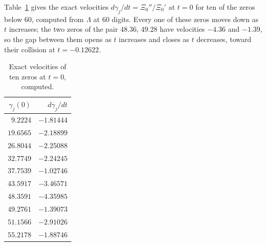 Table~\ref{tab:ch16:vel} gives the exact velocities $d\gamma_j/dt=\Xi_0''/\Xi_0'$ at $t=0$ for ten of the zeros below $60$, computed from $\Lambda$ at $60$ digits. Every one of these zeros moves down as $t$ increases; the two zeros of the pair $48.36$, $49.28$ have velocities $-4.36$ and $-1.39$, so the gap between them opens as $t$ increases and closes as $t$ decreases, toward their collision at $t=-0.12622$.

\begin{table}[htbp]
\centering\small
\begin{tabular}{rr}
\toprule
$\gamma_j(0)$ & $d\gamma_j/dt$\\
\midrule
$9.2224$ & $-1.81444$\\
$19.6565$ & $-2.18899$\\
$26.8044$ & $-2.25088$\\
$32.7749$ & $-2.24245$\\
$37.7539$ & $-1.02746$\\
$43.5917$ & $-3.46571$\\
$48.3591$ & $-4.35985$\\
$49.2761$ & $-1.39073$\\
$51.1566$ & $-2.91026$\\
$55.2178$ & $-1.88746$\\
\bottomrule
\end{tabular}
\caption{Exact velocities of ten zeros at $t=0$, computed.}\label{tab:ch16:vel}
\end{table}

